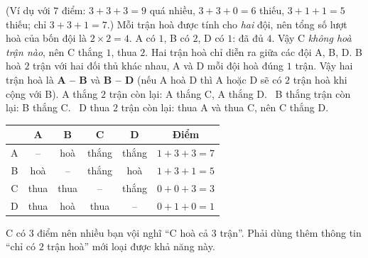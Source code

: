 {(Ví dụ với $7$ điểm: $3 + 3 + 3 = 9$ quá nhiều, $3 + 3 + 0 = 6$ thiếu, $3 + 1 + 1 = 5$ thiếu; chỉ $3 + 3 + 1 = 7$.)
Mỗi trận hoà được tính cho \emph{hai} đội, nên tổng số lượt hoà của bốn đội là $2\times 2 = 4$. A có $1$, B có $2$, D có $1$:
đã đủ $4$. Vậy C \emph{không hoà trận nào}, nên C thắng $1$, thua $2$.
Hai trận hoà chỉ diễn ra giữa các đội A, B, D. B hoà $2$ trận với hai đối thủ khác nhau, A và D mỗi đội hoà đúng $1$ trận. Vậy hai
trận hoà là \textbf{A -- B} và \textbf{B -- D} (nếu A hoà D thì A hoặc D sẽ có $2$ trận hoà khi cộng với B).
A thắng $2$ trận còn lại: A thắng C, A thắng D. \ B thắng trận còn lại: B thắng C. \ D thua $2$ trận còn lại: thua A và thua C,
nên C thắng D.
\begin{center}\small
\begin{tabular}{|c|c|c|c|c|c|}
\hline
\rowcolor{tmBlue!10} & A & B & C & D & Điểm\\ \hline
A & -- & hoà & thắng & thắng & $1 + 3 + 3 = 7$\\ \hline
B & hoà & -- & thắng & hoà & $1 + 3 + 1 = 5$\\ \hline
C & thua & thua & -- & thắng & $0 + 0 + 3 = 3$\\ \hline
D & thua & hoà & thua & -- & $0 + 1 + 0 = 1$\\ \hline
\end{tabular}
\end{center}
\begin{warnbox}C có $3$ điểm nên nhiều bạn vội nghĩ ``C hoà cả $3$ trận''. Phải dùng thêm thông tin ``chỉ có $2$ trận hoà'' mới loại
được khả năng này.\end{warnbox}
}

